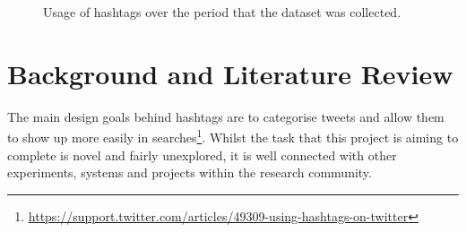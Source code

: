 \documentclass[12pt,a4paper]{article}
\begin{document}
\begin{figure}[H]
    \centering

    \caption{Usage of hashtags over the period that the dataset was collected.}
\end{figure}

\pagebreak

\section{Background and Literature Review}
\label{sec:litreview}
The main design goals behind hashtags are to categorise tweets and allow them to show up more easily in searches\footnote{\url{https://support.twitter.com/articles/49309-using-hashtags-on-twitter}}. Whilst the task that this project is aiming to complete is novel and fairly unexplored, it is well connected with other experiments, systems and projects within the research community.
\end{document}
